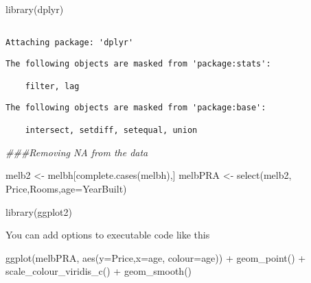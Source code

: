 \documentclass[
  letterpaper,
  DIV=11,
  numbers=noendperiod]{scrartcl}
\newenvironment{Shaded}{\begin{snugshade}}{\end{snugshade}}
\newcommand{\AttributeTok}[1]{\textcolor[rgb]{0.40,0.45,0.13}{#1}}
\newcommand{\DocumentationTok}[1]{\textcolor[rgb]{0.37,0.37,0.37}{\textit{#1}}}
\newcommand{\FunctionTok}[1]{\textcolor[rgb]{0.28,0.35,0.67}{#1}}
\newcommand{\NormalTok}[1]{\textcolor[rgb]{0.00,0.23,0.31}{#1}}
\newcommand{\OtherTok}[1]{\textcolor[rgb]{0.00,0.23,0.31}{#1}}
\newcommand{\SpecialCharTok}[1]{\textcolor[rgb]{0.37,0.37,0.37}{#1}}
\begin{document}
\begin{verbatim}
\end{verbatim}

\begin{Shaded}
\begin{Highlighting}[]
\FunctionTok{library}\NormalTok{(dplyr)}
\end{Highlighting}
\end{Shaded}

\begin{verbatim}

Attaching package: 'dplyr'
\end{verbatim}

\begin{verbatim}
The following objects are masked from 'package:stats':

    filter, lag
\end{verbatim}

\begin{verbatim}
The following objects are masked from 'package:base':

    intersect, setdiff, setequal, union
\end{verbatim}

\begin{Shaded}
\begin{Highlighting}[]
\DocumentationTok{\#\#\#Removing NA from the data  }
  
\NormalTok{melb2 }\OtherTok{\textless{}{-}}\NormalTok{ melbh[}\FunctionTok{complete.cases}\NormalTok{(melbh),]}
\NormalTok{melbPRA }\OtherTok{\textless{}{-}} \FunctionTok{select}\NormalTok{(melb2, Price,Rooms,}\AttributeTok{age=}\NormalTok{YearBuilt)}
\end{Highlighting}
\end{Shaded}

\begin{Shaded}
\begin{Highlighting}[]
\FunctionTok{library}\NormalTok{(ggplot2)}
\end{Highlighting}
\end{Shaded}

You can add options to executable code like this

\begin{Shaded}
\begin{Highlighting}[]
\FunctionTok{ggplot}\NormalTok{(melbPRA,}
       \FunctionTok{aes}\NormalTok{(}\AttributeTok{y=}\NormalTok{Price,}\AttributeTok{x=}\NormalTok{age, }\AttributeTok{colour=}\NormalTok{age)) }\SpecialCharTok{+}
  \FunctionTok{geom\_point}\NormalTok{() }\SpecialCharTok{+}
  \FunctionTok{scale\_colour\_viridis\_c}\NormalTok{() }\SpecialCharTok{+}
  \FunctionTok{geom\_smooth}\NormalTok{()}
\end{Highlighting}
\end{Shaded}
\end{document}
